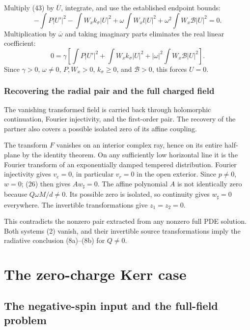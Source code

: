 \documentclass[11pt,a4paper]{article}
\begin{document}
Multiply (43) by \(\overline U\), integrate, and use the established
endpoint bounds: \[
 -\int P|U'|^2-\int W_x k_\sigma|U|^2
 +\omega\int W_xl|U|^2
 +\omega^2\int W_x\mathcal B|U|^2=0 .
\] Multiplication by \(\overline\omega\) and taking imaginary parts
eliminates the real linear coefficient: \[
 0=\gamma\left[
  \int P|U'|^2+\int W_x k_\sigma|U|^2
  +|\omega|^2\int W_x\mathcal B|U|^2\right].
 \tag{49}
\] Since \(\gamma>0\), \(\omega\ne0\), \(P,W_x>0\), \(k_\sigma\ge0\),
and \(\mathcal B>0\), this forces \(U=0\).

\subsubsection{Recovering the radial pair and the full charged field}\label{readable-injectivity}

The vanishing transformed field is carried back through holomorphic continuation, Fourier injectivity, and the first-order pair. The recovery of the partner also covers a possible isolated zero of its affine coupling.

The transform \(F\) vanishes on an interior complex ray, hence on its
entire half-plane by the identity theorem. On any sufficiently low
horizontal line it is the Fourier transform of an exponentially damped
tempered distribution. Fourier injectivity gives \(v_e=0\), in
particular \(v_r=0\) in the open exterior. Since \(p\ne0\), \(w=0\);
(26) then gives \(Aw_\sharp=0\). The affine polynomial \(A\) is not
identically zero because \(Q\omega M/d\ne0\). Its possible zero is
isolated, so continuity gives \(w_\sharp=0\) everywhere. The invertible
transformations give \(z_1=z_2=0\).

This contradicts the nonzero pair extracted from any nonzero full PDE
solution. Both systems (2) vanish, and their invertible source
transformations imply the radiative conclusion (8a)--(8b) for \(Q\ne0\).

\section{The zero-charge Kerr case}\label{the-zero-charge-kerr-case}

\subsection{The negative-spin input and the full-field problem}\label{readable-kerr-input}
\end{document}
